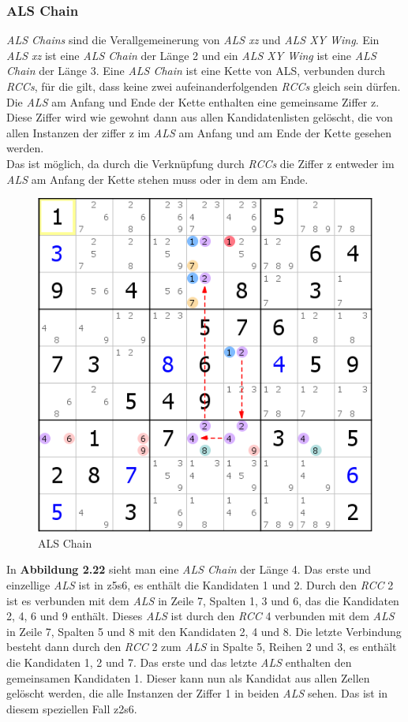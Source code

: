 \newpage
\subsubsection{ALS Chain}
\textit{ALS Chains} sind die Verallgemeinerung von \textit{ALS xz} und \textit{ALS XY Wing}. Ein \textit{ALS xz} ist eine \textit{ALS Chain} der Länge 2 und ein \textit{ALS XY Wing} ist eine \textit{ALS Chain} der Länge 3. Eine \textit{ALS Chain} ist eine Kette von {ALS}, verbunden durch \textit{RCCs}, für die gilt, dass keine zwei aufeinanderfolgenden \textit{RCCs} gleich sein dürfen. Die \textit{ALS} am Anfang und Ende der Kette enthalten eine gemeinsame Ziffer z. Diese Ziffer wird wie gewohnt dann aus allen Kandidatenlisten gelöscht, die von allen Instanzen der ziffer z im \textit{ALS} am Anfang und am Ende der Kette gesehen werden.\\
Das ist möglich, da durch die Verknüpfung durch \textit{RCCs} die Ziffer z entweder im \textit{ALS} am Anfang der Kette stehen muss oder in dem am Ende.

\begin{figure}[h]
\begin{center}
\includegraphics{./img/ALS_Chain.png}
\caption{ALS Chain}
\end{center}
\end{figure}

\noindent In \textbf{Abbildung 2.22} sieht man eine \textit{ALS Chain} der Länge 4. Das erste und einzellige \textit{ALS} ist in z5s6, es enthält die Kandidaten 1 und 2. Durch den \textit{RCC} 2 ist es verbunden mit dem \textit{ALS} in Zeile 7, Spalten 1, 3 und 6, das die Kandidaten 2, 4, 6 und 9 enthält. Dieses \textit{ALS} ist durch den \textit{RCC} 4 verbunden mit dem \textit{ALS} in Zeile 7, Spalten 5 und 8 mit den Kandidaten 2, 4 und 8. Die letzte Verbindung besteht dann durch den \textit{RCC} 2 zum \textit{ALS} in Spalte 5, Reihen 2 und 3, es enthält die Kandidaten 1, 2 und 7. Das erste und das letzte \textit{ALS} enthalten den gemeinsamen Kandidaten 1. Dieser kann nun als Kandidat aus allen Zellen gelöscht werden, die alle Instanzen der Ziffer 1 in beiden \textit{ALS} sehen. Das ist in diesem speziellen Fall z2s6.